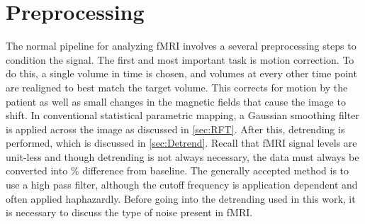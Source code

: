 \section{Preprocessing}
\label{sec:Methods Preprocessing}
The normal pipeline for analyzing
\ac{fMRI} involves a several preprocessing steps to condition the signal.
The first and most important
task is motion correction. To do this, a single volume in time is chosen, and
volumes at every other time point are realigned to best match the target volume. This corrects
for motion by the patient as well as small changes in the magnetic
fields that cause the image to shift.
In conventional statistical parametric mapping, a Gaussian smoothing
filter is applied across the image as discussed in \autoref{sec:RFT}.
After this, detrending is performed, which is discussed in \autoref{sec:Detrend}.
Recall that \ac{fMRI} signal levels are unit-less and though detrending is not
always necessary, the data must always be converted
into \% difference from baseline.
The generally accepted method is to use a high pass filter, although the
cutoff frequency is application dependent and often applied haphazardly.
Before going into the detrending used in this work, it is necessary to
discuss the type of noise present in \ac{fMRI}.

